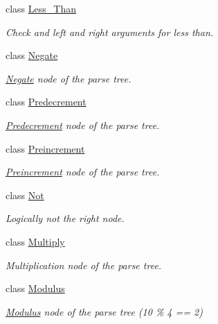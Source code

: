 \begin{DoxyCompactItemize}
class \hyperlink{classMadara_1_1Expression__Tree_1_1Less__Than}{Less\_\-Than}
\begin{DoxyCompactList}\small\item\em Check and left and right arguments for less than. \item\end{DoxyCompactList}\item 
class \hyperlink{classMadara_1_1Expression__Tree_1_1Negate}{Negate}
\begin{DoxyCompactList}\small\item\em \hyperlink{classMadara_1_1Expression__Tree_1_1Negate}{Negate} node of the parse tree. \item\end{DoxyCompactList}\item 
class \hyperlink{classMadara_1_1Expression__Tree_1_1Predecrement}{Predecrement}
\begin{DoxyCompactList}\small\item\em \hyperlink{classMadara_1_1Expression__Tree_1_1Predecrement}{Predecrement} node of the parse tree. \item\end{DoxyCompactList}\item 
class \hyperlink{classMadara_1_1Expression__Tree_1_1Preincrement}{Preincrement}
\begin{DoxyCompactList}\small\item\em \hyperlink{classMadara_1_1Expression__Tree_1_1Preincrement}{Preincrement} node of the parse tree. \item\end{DoxyCompactList}\item 
class \hyperlink{classMadara_1_1Expression__Tree_1_1Not}{Not}
\begin{DoxyCompactList}\small\item\em Logically not the right node. \item\end{DoxyCompactList}\item 
class \hyperlink{classMadara_1_1Expression__Tree_1_1Multiply}{Multiply}
\begin{DoxyCompactList}\small\item\em Multiplication node of the parse tree. \item\end{DoxyCompactList}\item 
class \hyperlink{classMadara_1_1Expression__Tree_1_1Modulus}{Modulus}
\begin{DoxyCompactList}\small\item\em \hyperlink{classMadara_1_1Expression__Tree_1_1Modulus}{Modulus} node of the parse tree (10 \% 4 == 2) \item\end{DoxyCompactList}\item 

\end{DoxyCompactItemize}
